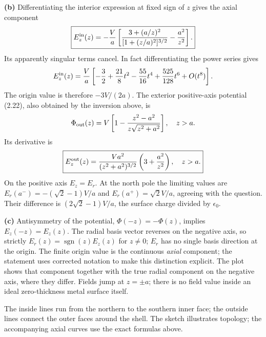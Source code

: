 \textbf{(b)} Differentiating the interior expression at fixed sign
of $z$ gives the axial component
\[
\boxed{E_z^{\rm in}(z)=-\frac Va
 \left[\frac{3+(a/z)^2}{[1+(z/a)^2]^{3/2}}-\frac{a^2}{z^2}\right].}
\]
Its apparently singular terms cancel. In fact differentiating the
power series gives
\[
E_z^{\rm in}(z)=\frac Va\left[-\frac32+\frac{21}{8}t^2
                     -\frac{55}{16}t^4+\frac{525}{128}t^6+O(t^8)\right].
\]
The origin value is therefore $-3V/(2a)$.
The exterior positive-axis potential (2.22), also obtained by the
inversion above, is
\[
\Phi_{\rm out}(z)=V\left[1-
             \frac{z^2-a^2}{z\sqrt{z^2+a^2}}\right],\quad z>a.
\]
Its derivative is
\[
\boxed{E_z^{\rm out}(z)=\frac{Va^2}{(z^2+a^2)^{3/2}}
                         \left(3+\frac{a^2}{z^2}\right),\quad z>a.}
\]
On the positive axis $E_z=E_r$. At the north pole the limiting
values are $E_r(a^-)=-\left(\sqrt2-1\right)V/a$ and
$E_r(a^+)=\sqrt2 V/a$, agreeing with the question. Their difference
is $(2\sqrt2-1)V/a$, the surface charge divided by $\epsilon _0$.

\textbf{(c)} Antisymmetry of the potential,
$\Phi(-z)=-\Phi(z)$, implies $E_z(-z)=E_z(z)$. The radial basis
vector reverses on the negative axis, so strictly
$E_r(z)=\operatorname{sgn}(z)E_z(z)$ for $z\ne0$; $E_r$ has no
single basis direction at the origin. The finite origin value is the continuous \emph{axial} component;
the statement uses corrected notation to make this distinction explicit. The plot shows that
component together with the true radial component on the negative
axis, where they differ. Fields jump at $z=\pm a$; there is no field
value inside an ideal zero-thickness metal surface itself.
\begin{center}
\par\medskip

\end{center}
The inside lines run from the northern to the southern inner face;
the outside lines connect the outer faces around the shell. The
sketch illustrates topology; the accompanying axial curves use the
exact formulas above.

